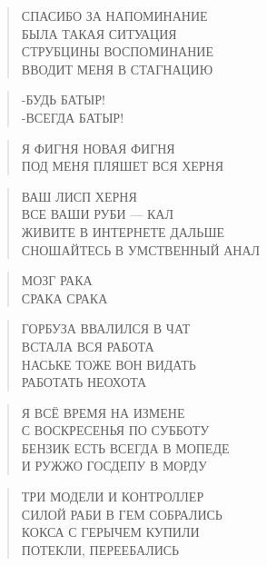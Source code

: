 \poemtitle{***}
\begin{verse}
СПАСИБО ЗА НАПОМИНАНИЕ\\
БЫЛА ТАКАЯ СИТУАЦИЯ\\
СТРУБЦИНЫ ВОСПОМИНАНИЕ\\
ВВОДИТ МЕНЯ В СТАГНАЦИЮ
\end{verse}

\poemtitle{***}
\begin{verse}
-БУДЬ БАТЫР!\\
-ВСЕГДА БАТЫР!
\end{verse}

\poemtitle{***}
\begin{verse}
Я ФИГНЯ НОВАЯ ФИГНЯ\\
ПОД МЕНЯ ПЛЯШЕТ ВСЯ ХЕРНЯ
\end{verse}

\poemtitle{***}
\begin{verse}
ВАШ ЛИСП ХЕРНЯ\\
ВСЕ ВАШИ РУБИ — КАЛ\\
ЖИВИТЕ В ИНТЕРНЕТЕ ДАЛЬШЕ\\
СНОШАЙТЕСЬ В УМСТВЕННЫЙ АНАЛ
\end{verse}

\poemtitle{***}
\begin{verse}
МОЗГ РАКА\\
СРАКА СРАКА
\end{verse}

\poemtitle{***}
\begin{verse}
ГОРБУЗА ВВАЛИЛСЯ В ЧАТ\\
ВСТАЛА ВСЯ РАБОТА\\
НАСЬКЕ ТОЖЕ ВОН ВИДАТЬ\\
РАБОТАТЬ НЕОХОТА
\end{verse}

\poemtitle{***}
\begin{verse}
Я ВСЁ ВРЕМЯ НА ИЗМЕНЕ\\
С ВОСКРЕСЕНЬЯ ПО СУББОТУ\\
БЕНЗИК ЕСТЬ ВСЕГДА В МОПЕДЕ\\
И РУЖЖО ГОСДЕПУ В МОРДУ
\end{verse}

\poemtitle{***}
\begin{verse}
ТРИ МОДЕЛИ И КОНТРОЛЛЕР\\
СИЛОЙ РАБИ В ГЕМ СОБРАЛИСЬ\\
КОКСА С ГЕРЫЧЕМ КУПИЛИ\\
ПОТЕКЛИ, ПЕРЕЕБАЛИСЬ
\end{verse}

